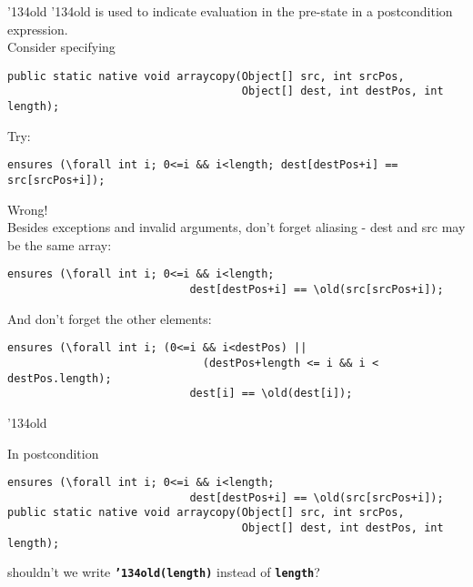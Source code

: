 \documentclass[
pdf,
nocolorBG,
slideColor,
cok,
]{prosper}
\newcommand{\code}[1]{{\rm \texttt{\textbf{\small #1}}}}
\newcommand{\bsl}{\char'134}
\newcommand{\old}{\bsl old}
\begin{document}
\begin{slide}{\old}
\vspace*{-6ex}
{\knalblue \old} is used to indicate evaluation in the pre-state in a postcondition expression.\\
\vspace{1ex}
Consider specifying
{\tiny
\begin{verbatim} 
public static native void arraycopy(Object[] src, int srcPos,
                                    Object[] dest, int destPos, int length);
\end{verbatim}
}
Try:
{\tiny
\begin{verbatim} 
ensures (\forall int i; 0<=i && i<length; dest[destPos+i] == src[srcPos+i]);
\end{verbatim}
}

{\red
Wrong!}\\
\vspace{1ex}
Besides exceptions and invalid arguments, don't forget aliasing - {\blue dest} and {\blue src} may be the same array:
{\tiny
\begin{verbatim} 
ensures (\forall int i; 0<=i && i<length; 
                            dest[destPos+i] == \old(src[srcPos+i]);
\end{verbatim}
}
And don't forget the other elements:
{\tiny
\begin{verbatim} 
ensures (\forall int i; (0<=i && i<destPos) || 
                              (destPos+length <= i && i < destPos.length); 
                            dest[i] == \old(dest[i]);
\end{verbatim}
}

\end{slide}


\begin{slide}{\old}
\vspace*{-6ex}

In postcondition 
{\tiny
\begin{verbatim} 
ensures (\forall int i; 0<=i && i<length; 
                            dest[destPos+i] == \old(src[srcPos+i]);
public static native void arraycopy(Object[] src, int srcPos,
                                    Object[] dest, int destPos, int length);
\end{verbatim}
}
shouldn't we write \code{\old(length)} instead of \code{length}?

\end{slide}
\end{document}
